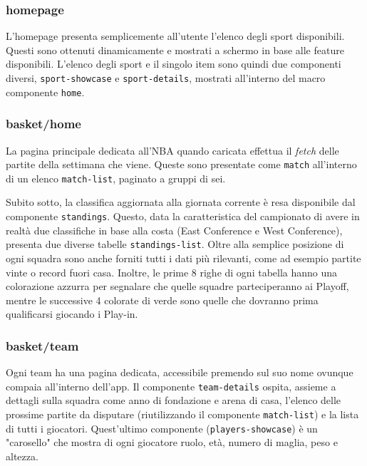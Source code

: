 \subsubsection{homepage}
L'homepage presenta semplicemente all'utente l'elenco degli sport disponibili. Questi sono ottenuti dinamicamente e mostrati a schermo in base alle feature disponibili. L'elenco degli sport e il singolo item sono quindi due componenti diversi, \texttt{sport-showcase} e \texttt{sport-details}, mostrati all'interno del macro componente \texttt{home}.

\subsubsection{basket/home}
La pagina principale dedicata all'NBA quando caricata effettua il \textit{fetch} delle partite della settimana che viene. Queste sono presentate come \texttt{match} all'interno di un elenco \texttt{match-list}, paginato a gruppi di sei. 

Subito sotto, la classifica aggiornata alla giornata corrente è resa disponibile dal componente \texttt{standings}. Questo, data la caratteristica del campionato di avere in realtà due classifiche in base alla costa (East Conference e West Conference), presenta due diverse tabelle \texttt{standings-list}. Oltre alla semplice posizione di ogni squadra sono anche forniti tutti i dati più rilevanti, come ad esempio partite vinte o record fuori casa.
Inoltre, le prime 8 righe di ogni tabella hanno una colorazione azzurra per segnalare che quelle squadre parteciperanno ai Playoff, mentre le successive 4 colorate di verde sono quelle che dovranno prima qualificarsi giocando i Play-in. 

\subsubsection{basket/team}
Ogni team ha una pagina dedicata, accessibile premendo sul suo nome ovunque compaia all'interno dell'app. Il componente \texttt{team-details} ospita, assieme a dettagli sulla squadra come anno di fondazione e arena di casa, l'elenco delle prossime partite da disputare (riutilizzando il componente \texttt{match-list}) e la lista di tutti i giocatori. Quest'ultimo componente (\texttt{players-showcase}) è un "carosello" che mostra di ogni giocatore ruolo, età, numero di maglia, peso e altezza.

